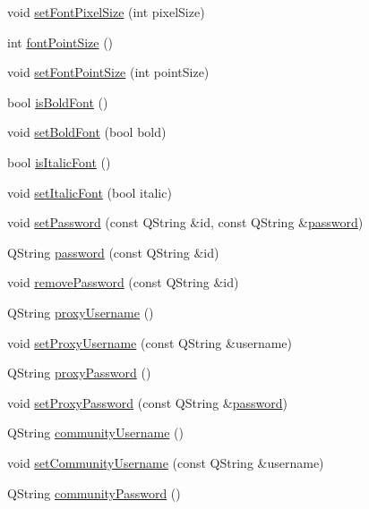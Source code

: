 \begin{DoxyCompactItemize}
void \hyperlink{class_u_b_settings_a0b104f8adde3735b1c0cb6bd48cc8b70}{set\-Font\-Pixel\-Size} (int pixel\-Size)
\item 
int \hyperlink{class_u_b_settings_a1e41fd8d8f405d1655bfde52e48adbe9}{font\-Point\-Size} ()
\item 
void \hyperlink{class_u_b_settings_a2da8021ba2c62727724f931442a58c64}{set\-Font\-Point\-Size} (int point\-Size)
\item 
bool \hyperlink{class_u_b_settings_a7902b7be4ce2a0ad1d55c41c464a07ab}{is\-Bold\-Font} ()
\item 
void \hyperlink{class_u_b_settings_a5194a30c471ad4dc15fdbc99a7b64188}{set\-Bold\-Font} (bool bold)
\item 
bool \hyperlink{class_u_b_settings_a8c1ddd0b0ef139ee370dccd1906fd0dc}{is\-Italic\-Font} ()
\item 
void \hyperlink{class_u_b_settings_a6e81b5086d516060e3cef858778ed144}{set\-Italic\-Font} (bool italic)
\item 
void \hyperlink{class_u_b_settings_a20c9289b181a34a32128f0a463ace726}{set\-Password} (const Q\-String \&id, const Q\-String \&\hyperlink{class_u_b_settings_a777d499c976f274487411b565b278e16}{password})
\item 
Q\-String \hyperlink{class_u_b_settings_a777d499c976f274487411b565b278e16}{password} (const Q\-String \&id)
\item 
void \hyperlink{class_u_b_settings_abbc40418a1408fcf5a05ef0fe512e818}{remove\-Password} (const Q\-String \&id)
\item 
Q\-String \hyperlink{class_u_b_settings_a928571040329d1026cda18993e844fc7}{proxy\-Username} ()
\item 
void \hyperlink{class_u_b_settings_a56a27de17cafca29a33595a8cc29fdf3}{set\-Proxy\-Username} (const Q\-String \&username)
\item 
Q\-String \hyperlink{class_u_b_settings_a0e0a770e7d0532ba0f9ae57a49fb63bf}{proxy\-Password} ()
\item 
void \hyperlink{class_u_b_settings_a369d50aa4d29b24354abc3f83df3f038}{set\-Proxy\-Password} (const Q\-String \&\hyperlink{class_u_b_settings_a777d499c976f274487411b565b278e16}{password})
\item 
Q\-String \hyperlink{class_u_b_settings_ae0c3fadd0acb79ed423ec34e82c06e9b}{community\-Username} ()
\item 
void \hyperlink{class_u_b_settings_ab5b70f5ef7cf056b9a9d1485bb442feb}{set\-Community\-Username} (const Q\-String \&username)
\item 
Q\-String \hyperlink{class_u_b_settings_ad3bb15a7e2c5d6bfa5c2a33cea93e9a5}{community\-Password} ()

\end{DoxyCompactItemize}
